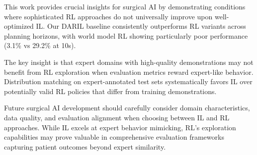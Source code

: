 \documentclass[runningheads]{llncs}
\begin{document}
This work provides crucial insights for surgical AI by demonstrating conditions where sophisticated RL approaches do not universally improve upon well-optimized IL. Our DARIL baseline consistently outperforms RL variants across planning horizons, with world model RL showing particularly poor performance (3.1\% vs 29.2\% at 10s).

The key insight is that expert domains with high-quality demonstrations may not benefit from RL exploration when evaluation metrics reward expert-like behavior. Distribution matching on expert-annotated test sets systematically favors IL over potentially valid RL policies that differ from training demonstrations.

Future surgical AI development should carefully consider domain characteristics, data quality, and evaluation alignment when choosing between IL and RL approaches. While IL excels at expert behavior mimicking, RL's exploration capabilities may prove valuable in comprehensive evaluation frameworks capturing patient outcomes beyond expert similarity.

%


\end{document}
